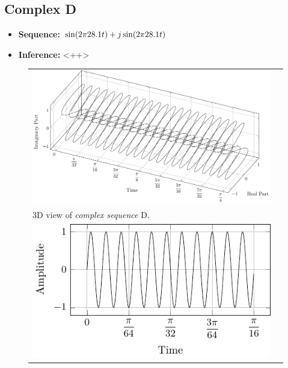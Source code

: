 \documentclass[../../course]{subfiles}
\begin{document}
\subsection{Complex D}

\begin{itemize} [label=]

    \item \textbf{Sequence:} $\sin(2 \pi 28.1 t) + j \sin(2 \pi 28.1 t)$

    \item \textbf{Inference:} <++>

\end{itemize}

\begin{figure} [H]

    \renewcommand{\arraystretch}{0.75}
    \centering
    \begin{NiceTabularX} {\textwidth} {
            *{2}{>{\centering\arraybackslash}X}
        }

         {
             {
                \includegraphics[height = \textheight] {tikzpics/plotComplexD.pdf}
            }
        }

        &
        \\

         {
            \vbox{
                 {3D view of \emph{complex sequence} D.}
                \label{plt:cmplxD}
            }
        }

        &
        \\

         {
             {
                \includegraphics[height = \textheight] {tikzpics/plotShortX2.pdf}
            }
        }


\end{NiceTabularX}
\end{figure}
\end{document}
